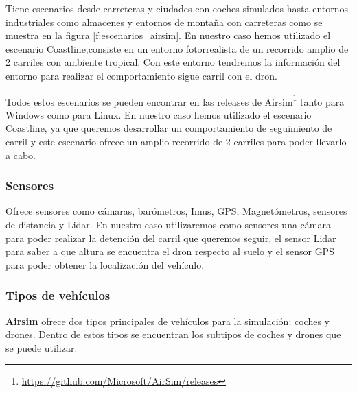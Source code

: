 Tiene escenarios desde carreteras y ciudades con coches simulados hasta entornos industriales como almacenes y entornos de montaña con carreteras como se 
muestra en la figura \ref{f:escenarios_airsim}. En nuestro caso
hemos utilizado el escenario Coastline,consiste en un entorno fotorrealista de un recorrido amplio de 2 carriles con ambiente tropical. Con este entorno tendremos la
información del entorno para realizar el comportamiento sigue carril con el dron. \newline

Todos estos escenarios se pueden encontrar en las releases de Airsim\footnote{\url{https://github.com/Microsoft/AirSim/releases}} tanto para Windows como para Linux.
En nuestro caso hemos utilizado el escenario Coastline, ya que queremos desarrollar un comportamiento de seguimiento de carril y este escenario ofrece un amplio recorrido de 2 carriles para poder llevarlo
a cabo.



\subsubsection{Sensores}
\label{sec:airsim}
Ofrece sensores como cámaras, barómetros, Imus, GPS, Magnetómetros, sensores de distancia y Lidar.
En nuestro caso utilizaremos como sensores una cámara para poder realizar la detención del carril 
que queremos seguir, el sensor Lidar para saber a que altura se encuentra el dron respecto al suelo y el sensor
GPS para poder obtener la localización del vehículo. 

\subsubsection{Tipos de vehículos}
\label{sec:airsim}
\textbf{Airsim} ofrece dos tipos principales de vehículos para la simulación: coches y drones. Dentro de estos tipos se encuentran los subtipos de coches y drones que se puede utilizar.

